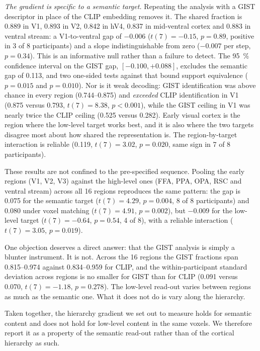 \documentclass[11pt,a4paper]{article}
\begin{document}
\emph{The gradient is specific to a semantic target.} Repeating the analysis with
a GIST descriptor in place of the CLIP embedding removes it. The shared fraction
is \num{0.889} in V1, \num{0.893} in V2, \num{0.842} in hV4, \num{0.837} in
mid-ventral cortex and \num{0.883} in ventral stream: a V1-to-ventral gap of
$-\num{0.006}$ ($t(7) = -0.15$, $p = 0.89$, positive in 3 of 8 participants) and
a slope indistinguishable from zero ($-\num{0.007}$ per step, $p = 0.34$). This
is an informative null rather than a failure to detect. The \SI{95}{\percent}
confidence interval on the GIST gap, $[-\num{0.100}, +\num{0.088}]$, excludes the
semantic gap of \num{0.113}, and two one-sided tests against that bound support
equivalence ($p = 0.015$ and $p = 0.010$). Nor is it weak decoding: GIST
identification was above chance in every region (\num{0.744}--\num{0.875}) and
\emph{exceeded} CLIP identification in V1 (\num{0.875} versus \num{0.793},
$t(7) = 8.38$, $p < 0.001$), while the GIST ceiling in V1 was nearly twice the
CLIP ceiling (\num{0.525} versus \num{0.282}). Early visual cortex is the region
where the low-level target works best, and it is also where the two targets
disagree most about how shared the representation is. The region-by-target
interaction is reliable (\num{0.119}, $t(7) = 3.02$, $p = 0.020$, same sign in 7
of 8 participants).

These results are not confined to the pre-specified sequence. Pooling the early
regions (V1, V2, V3) against the high-level ones (FFA, PPA, OPA, RSC and ventral
stream) across all 16 regions reproduces the same pattern: the gap is
\num{0.075} for the semantic target ($t(7) = 4.29$, $p = 0.004$, 8 of 8
participants) and \num{0.080} under voxel matching ($t(7) = 4.91$, $p = 0.002$),
but $-\num{0.009}$ for the low-level target ($t(7) = -0.64$, $p = 0.54$, 4 of 8),
with a reliable interaction ($t(7) = 3.05$, $p = 0.019$).

One objection deserves a direct answer: that the GIST analysis is simply a
blunter instrument. It is not. Across the 16 regions the GIST fractions span
\num{0.815}--\num{0.974} against \num{0.834}--\num{0.959} for CLIP, and the
within-participant standard deviation across regions is no smaller for GIST than
for CLIP (\num{0.091} versus \num{0.070}, $t(7) = -1.18$, $p = 0.278$). The
low-level read-out varies between regions as much as the semantic one. What it
does not do is vary along the hierarchy.

Taken together, the hierarchy gradient we set out to measure holds for semantic
content and does not hold for low-level content in the same voxels. We therefore
report it as a property of the semantic read-out rather than of the cortical
hierarchy as such.
\end{document}
